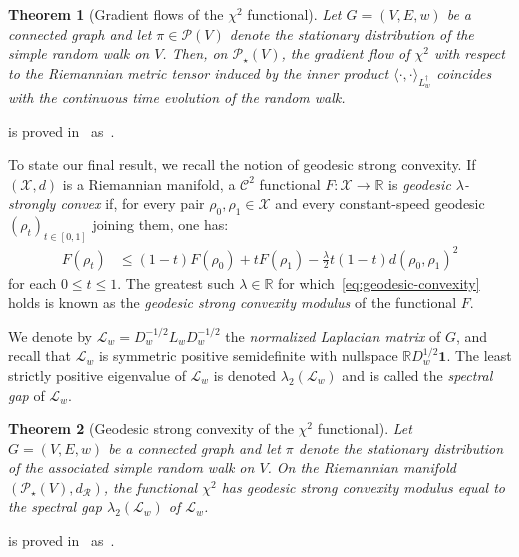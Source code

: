 \documentclass[11pt,a4paper]{article}
\newcommand{\Resis}{\mathcal{R}}
\newcommand{\Prob}{\mathscr{P}}
\newtheorem{theorem}{Theorem}[section]
\begin{document}
\begin{theorem}[Gradient flows of the $\chi^{2}$ functional]\label{thm:gradient-flow}
    Let $G=(V,E,w)$ be a connected graph and let $\pi\in\Prob(V)$ denote the stationary distribution of the simple random walk on $V$. Then, on $\Prob_\star(V)$, the gradient flow of $\chi^2$ with respect to the Riemannian metric tensor induced by the inner product $\langle\cdot,\cdot\rangle_{L_{w}^\dagger}$ coincides with the continuous time evolution of the random walk.
\end{theorem}

 is proved in~ as~.

To state our final result, we recall the notion of geodesic strong convexity. If $(\mathcal{X}, d)$ is a Riemannian manifold, a $\mathcal{C}^2$ functional $F:\mathcal{X}\to\mathbb{R}$ is \emph{geodesic $\lambda$-strongly convex} if, for every pair $\rho_0,\rho_1\in\mathcal{X}$ and every constant-speed geodesic $(\rho_t)_{t\in[0,1]}$ joining them, one has:
    \begin{align}\label{eq:geodesic-convexity}
        F(\rho_t) &\leq (1-t)F(\rho_0) + t F(\rho_1) - \frac{\lambda}{2} t(1-t) d(\rho_0,\rho_1)^2
    \end{align}
for each $0\le t\le 1$. The greatest such $\lambda\in\mathbb{R}$ for which~\cref{eq:geodesic-convexity} holds is known as the \emph{geodesic strong convexity modulus} of the functional $F$. 

We denote by $\mathcal{L}_w = D_w^{-1/2} L_w D_w^{-1/2}$ the \emph{normalized Laplacian matrix} of $G$, and recall that $\mathcal{L}_w$ is symmetric positive semidefinite with nullspace $\mathbb{R} D_w^{1/2}\mathbf{1}$. The least strictly positive eigenvalue of $\mathcal{L}_w$ is denoted $\lambda_2(\mathcal{L}_w)$ and is called the \emph{spectral gap} of $\mathcal{L}_w$.

\begin{theorem}[Geodesic strong convexity of the $\chi^{2}$ functional]\label{thm:modulus}
    Let $G=(V,E,w)$ be a connected graph and let $\pi$ denote the stationary distribution of the associated simple random walk on $V$. On the Riemannian manifold $(\Prob_\star(V),d_{\Resis})$, the functional $\chi^2$ has geodesic strong convexity modulus equal to the spectral gap $\lambda_2(\mathcal{L}_w)$ of $\mathcal{L}_{w}$.
\end{theorem}

 is proved in~ as~.
\end{document}
